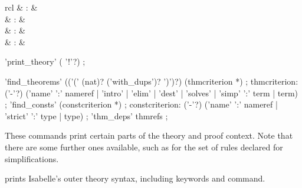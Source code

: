 \begin{isabellebody}
\begin{isamarkuptext}
\begin{matharray}{rcl}
    \hypertarget{command.find-consts}{\hyperlink{command.find-consts}{\mbox{}}}\isa{{\isachardoublequote}\isactrlsup {\isacharasterisk}{\isachardoublequote}} & : &  \\
    \hypertarget{command.thm-deps}{\hyperlink{command.thm-deps}{\mbox{}}}\isa{{\isachardoublequote}\isactrlsup {\isacharasterisk}{\isachardoublequote}} & : &  \\
    \hypertarget{command.print-facts}{\hyperlink{command.print-facts}{\mbox{}}}\isa{{\isachardoublequote}\isactrlsup {\isacharasterisk}{\isachardoublequote}} & : &  \\
    \hypertarget{command.print-binds}{\hyperlink{command.print-binds}{\mbox{}}}\isa{{\isachardoublequote}\isactrlsup {\isacharasterisk}{\isachardoublequote}} & : &  \\
  \end{matharray}

  \begin{rail}
    'print\_theory' ( '!'?)
    ;

    'find\_theorems' (('(' (nat)? ('with\_dups')? ')')?) (thmcriterion *)
    ;
    thmcriterion: ('-'?) ('name' ':' nameref | 'intro' | 'elim' | 'dest' |
      'solves' | 'simp' ':' term | term)
    ;
    'find\_consts' (constcriterion *)
    ;
    constcriterion: ('-'?) ('name' ':' nameref | 'strict' ':' type | type)
    ;
    'thm\_deps' thmrefs
    ;
  \end{rail}

  These commands print certain parts of the theory and proof context.
  Note that there are some further ones available, such as for the set
  of rules declared for simplifications.

  \begin{description}
  
  \item \hyperlink{command.print-commands}{\mbox{}} prints Isabelle's outer theory
  syntax, including keywords and command.
  

\end{description}
\end{isamarkuptext}
\end{isabellebody}
